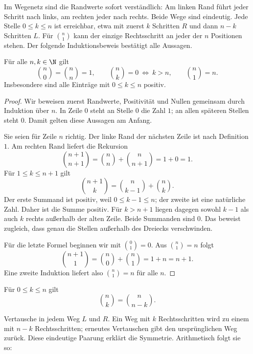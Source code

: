 Im Wegenetz sind die Randwerte sofort verständlich: Am linken Rand
führt jeder Schritt nach links, am rechten jeder nach rechts. Beide
Wege sind eindeutig. Jede Stelle $0\le k\le n$ ist erreichbar, etwa
mit zuerst $k$ Schritten $R$ und dann $n-k$ Schritten $L$.
Für $\binom n1$ kann der einzige Rechtsschritt an jeder der $n$
Positionen stehen. Der folgende Induktionsbeweis bestätigt alle Aussagen.

\begin{satz}
Für alle $n,k\in\N$ gilt
\begin{equation}\tag{G}\label{bin:boundary}
 \binom n0=\binom nn=1,\qquad
 \binom nk=0\ \Longleftrightarrow\ k>n,\qquad
 \binom n1=n.
\end{equation}
Insbesondere sind alle Einträge mit $0\le k\le n$ positiv.
\end{satz}

\begin{proof}
Wir beweisen zuerst Randwerte, Positivität und Nullen gemeinsam durch
Induktion über $n$. In Zeile $0$ steht an Stelle $0$ die Zahl $1$;
an allen späteren Stellen steht $0$. Damit gelten diese Aussagen am Anfang.

Sie seien für Zeile $n$ richtig. Der linke Rand der nächsten Zeile ist
nach Definition $1$. Am rechten Rand liefert die Rekursion
\[
 \binom{n+1}{n+1}=\binom nn+\binom n{n+1}=1+0=1.
\]
Für $1\le k\le n+1$ gilt
\[
 \binom{n+1}k=\binom n{k-1}+\binom nk.
\]
Der erste Summand ist positiv, weil $0\le k-1\le n$; der zweite ist
eine natürliche Zahl. Daher ist die Summe positiv.
Für $k>n+1$ liegen dagegen sowohl $k-1$ als auch $k$ rechts außerhalb
der alten Zeile. Beide Summanden sind $0$. Das beweist zugleich,
dass genau die Stellen außerhalb des Dreiecks verschwinden.

Für die letzte Formel beginnen wir mit $\binom01=0$. Aus
$\binom n1=n$ folgt
\[
 \binom{n+1}1=\binom n0+\binom n1=1+n=n+1.
\]
Eine zweite Induktion liefert also $\binom n1=n$ für alle $n$.
\end{proof}

\begin{satz}[Symmetrie]
Für $0\le k\le n$ gilt
\begin{equation}\tag{S}\label{bin:symmetry}
 \binom nk=\binom n{n-k}.
\end{equation}
\end{satz}

\Beweisidee Vertausche in jedem Weg $L$ und $R$. Ein Weg mit $k$
Rechtsschritten wird zu einem mit $n-k$ Rechtsschritten; erneutes
Vertauschen gibt den ursprünglichen Weg zurück. Diese eindeutige
Paarung erklärt die Symmetrie. Arithmetisch folgt sie so:

